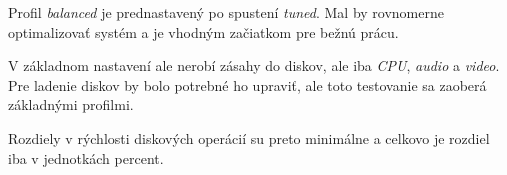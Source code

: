 Profil \emph{balanced} je prednastavený po spustení \emph{tuned}. Mal by
rovnomerne optimalizovať systém a je vhodným začiatkom pre bežnú prácu.

V základnom nastavení ale nerobí zásahy do diskov, ale iba \emph{CPU},
\emph{audio} a \emph{video}. Pre ladenie diskov by bolo potrebné ho upraviť,
ale toto testovanie sa zaoberá základnými profilmi.

Rozdiely v rýchlosti diskových operácií su preto minimálne a celkovo je rozdiel
iba v jednotkách percent.
